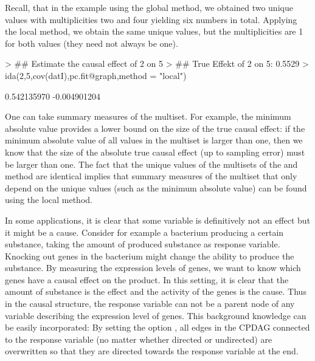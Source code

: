 \documentclass[article]{jss}
\begin{document}
Recall, that in the example using the global method, we obtained two unique
values with multiplicities two and four yielding six numbers in total.
Applying the local method, we obtain the same unique values, but the
multiplicities are 1 for both values (they need not always be one).

\begin{Schunk}
\begin{Sinput}
> ## Estimate the causal effect of 2 on 5
> ## True Effekt of 2 on 5: 0.5529
> ida(2,5,cov(datI),pc.fit@graph,method = "local")
\end{Sinput}
\begin{Soutput}
[1]  0.542135970 -0.004901204
\end{Soutput}
\end{Schunk}

One can take summary measures of the multiset. For example, the minimum
absolute value provides a lower bound on the size of the true causal
effect: if the minimum absolute value of all values in the multiset is
larger than one, then we know that the size of the absolute true causal
effect (up to sampling error) must be larger than one. The fact that the
unique values of the multisets of the  and 
method are identical implies that summary measures of the multiset that
only depend on the unique values (such as the minimum absolute value) can
be found using the local method.

In some applications, it is clear that some variable is definitively not an
effect but it might be a cause. Consider for example a bacterium producing
a certain substance, taking the amount of produced substance as response
variable. Knocking out genes in the bacterium might change the ability to
produce the substance. By measuring the expression levels of genes, we want
to know which genes have a causal effect on the product. In this setting,
it is clear that the amount of substance is the effect and the activity of
the genes is the cause. Thus in the causal structure, the response variable
can not be a parent node of any variable describing the expression level of
genes. This background knowledge can be easily incorporated: By setting the
option , all edges in the CPDAG connected to the
response variable (no matter whether directed or undirected) are overwritten so
that they are directed towards the response variable at the end.
\end{document}
